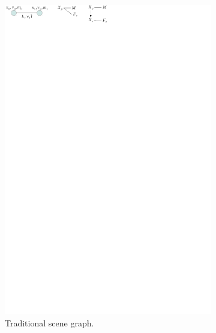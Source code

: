 \begin{figure}
\begin{subfigure}[t]{0.3\linewidth}
   \includegraphics[clip,trim=50mm 285mm 130mm 0mm]{mass-spring.pdf}
   \caption{Traditional \sofa{} scene graph.} \label{fig mass-spring-traditional}
 \end{subfigure}
 \begin{subfigure}[t]{0.3\linewidth} \centering

\end{subfigure}
\end{figure}
